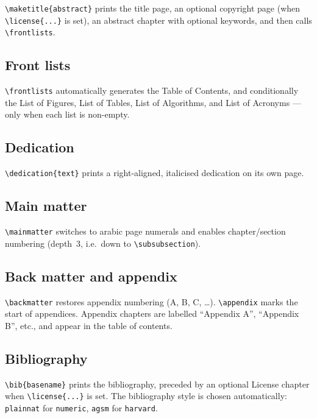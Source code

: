 \documentclass[sans,oneside,numeric,raggedright,fullwidth]{qbook}
\begin{document}
\verb|\maketitle{abstract}| prints the title page, an optional copyright
page (when \verb|\license{...}| is set), an abstract chapter with optional
keywords, and then calls \verb|\frontlists|.

\subsection{Front lists}

\verb|\frontlists| automatically generates the Table of Contents, and
conditionally the List of Figures, List of Tables, List of Algorithms, and
List of Acronyms --- only when each list is non-empty.

\subsection{Dedication}

\verb|\dedication{text}| prints a right-aligned, italicised dedication on
its own page.

\subsection{Main matter}

\verb|\mainmatter| switches to arabic page numerals and enables
chapter/section numbering (depth~3, i.e.\ down to \verb|\subsubsection|).

\subsection{Back matter and appendix}

\verb|\backmatter| restores appendix numbering (A, B, C, \ldots).
\verb|\appendix| marks the start of appendices.  Appendix chapters are
labelled ``Appendix A'', ``Appendix B'', etc., and appear in the table
of contents.

\subsection{Bibliography}

\verb|\bib{basename}| prints the bibliography, preceded by an optional
License chapter when \verb|\license{...}| is set.  The bibliography
style is chosen automatically:
\texttt{plainnat} for \texttt{numeric}, \texttt{agsm} for
\texttt{harvard}.
\end{document}
